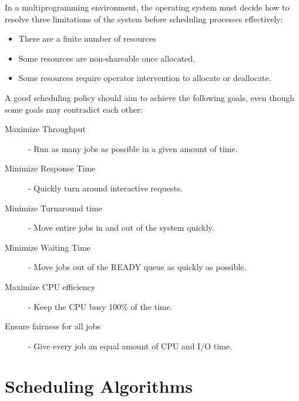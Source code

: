 \documentclass[12pt letter]{report}
\begin{document}




In a multiprogramming environment, the operating system must decide
how to resolve three limitations of the system before scheduling
processes effectively:
\begin{itemize}
  \item There are a finite number of resources
  \item Some resources are non-shareable once allocated.
  \item Some resources require operator intervention to allocate or deallocate.
\end{itemize}

A good scheduling policy should aim to achieve the following goals,
even though some goals may contradict each other:
\begin{description}
  \item[Maximize Throughput]  - Run as many jobs as possible in a
    given amount of time.
  \item[Minimize Response Time ] - Quickly turn
    around interactive requests.
  \item[Minimize Turnaround time] - Move entire jobs in and out of
    the system quickly.
  \item[Minimize Waiting Time] - Move jobs out of the READY queue as
    quickly as possible.
  \item[Maximize CPU efficiency] - Keep the CPU busy 100\% of the time.
  \item[Ensure fairness for all jobs] - Give every job an equal
    amount of CPU and I/O time.
\end{description}

\section{Scheduling Algorithms}
\end{document}

